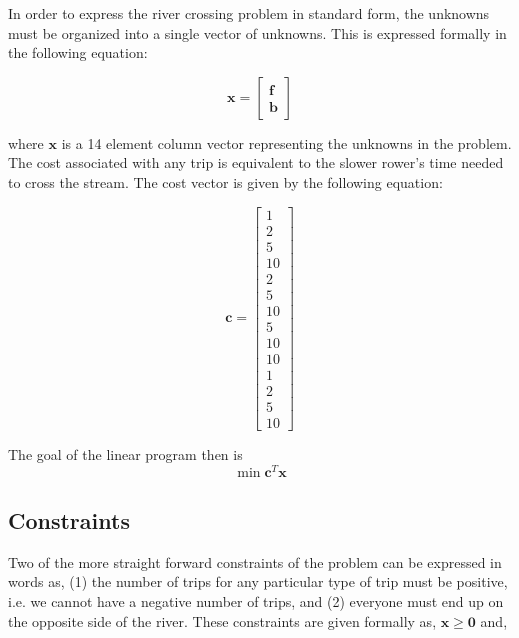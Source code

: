 \documentclass{article}
\begin{document}
In order to express the river crossing problem in standard form, the unknowns must be organized into a single vector of unknowns.
This is expressed formally in the following equation:

\begin{equation} \label{eq:xvec}
	\mathbf{x} = \begin{bmatrix} \mathbf{f} \\ \mathbf{b} \end{bmatrix}
\end{equation}

\noindent where $\mathbf{x}$ is a 14 element column vector representing the unknowns in the problem.
The cost associated with any trip is equivalent to the slower rower's time needed to cross the stream.
The cost vector is given by the following equation:

\begin{equation} \label{eq:cvec}
\mathbf{c} = \begin{bmatrix} 1 \\ 2 \\ 5 \\ 10 \\ 2 \\ 5 \\ 10 \\ 5 \\ 10 \\ 10 \\ 1 \\ 2 \\ 5 \\ 10 \end{bmatrix}
\end{equation} \hfill

The goal of the linear program then is ~\begin{equation} \label{eq:LP-goal} \min{\mathbf{c}^T \mathbf{x}} \end{equation}

\subsection{Constraints}

Two of the more straight forward constraints of the problem can be expressed in words as, (1) the number of trips for any particular type of trip must be positive, i.e. we cannot have a negative number of trips, and (2) everyone must end up on the opposite side of the river.
These constraints are given formally as, $\mathbf{x} \ge \mathbf{0}$ and,
\end{document}
